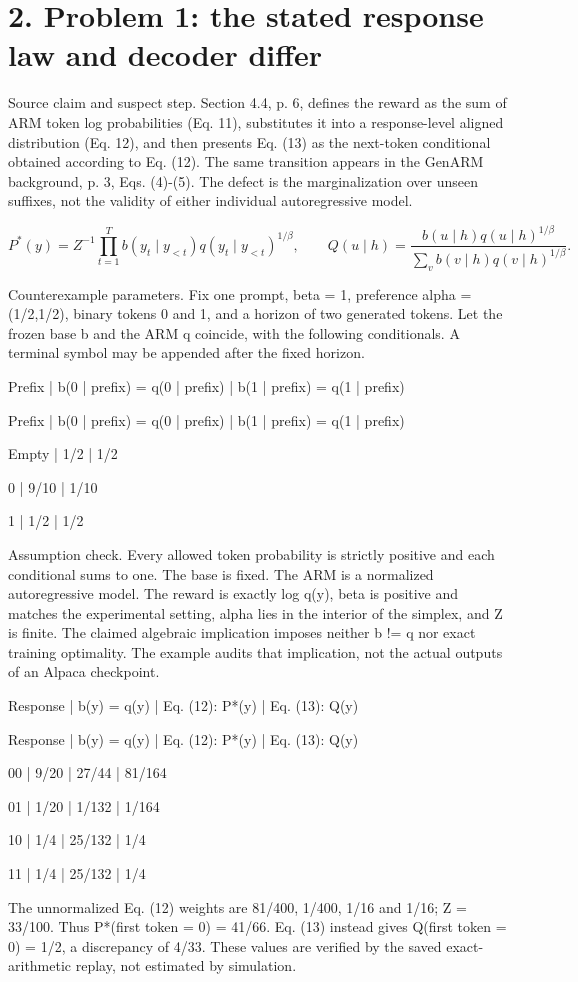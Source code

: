 \documentclass[10pt]{article}
\begin{document}
\section*{2. Problem 1: the stated response law and decoder differ}
Source claim and suspect step. Section 4.4, p. 6, defines the reward as the sum of ARM token log probabilities (Eq. 11), substitutes it into a response-level aligned distribution (Eq. 12), and then presents Eq. (13) as the next-token conditional obtained according to Eq. (12). The same transition appears in the GenARM background, p. 3, Eqs. (4)-(5). The defect is the marginalization over unseen suffixes, not the validity of either individual autoregressive model.\par
\[P^*(y)=Z^{-1}\prod_{t=1}^{T}b(y_t\mid y_{<t})q(y_t\mid y_{<t})^{1/\beta},\qquad Q(u\mid h)=\frac{b(u\mid h)q(u\mid h)^{1/\beta}}{\sum_v b(v\mid h)q(v\mid h)^{1/\beta}}.\]\par
Counterexample parameters. Fix one prompt, beta = 1, preference alpha = (1/2,1/2), binary tokens 0 and 1, and a horizon of two generated tokens. Let the frozen base b and the ARM q coincide, with the following conditionals. A terminal symbol may be appended after the fixed horizon.\par
Prefix | b(0 | prefix) = q(0 | prefix) | b(1 | prefix) = q(1 | prefix)\par
Prefix | b(0 | prefix) = q(0 | prefix) | b(1 | prefix) = q(1 | prefix)\par
Empty | 1/2 | 1/2\par
0 | 9/10 | 1/10\par
1 | 1/2 | 1/2\par
Assumption check. Every allowed token probability is strictly positive and each conditional sums to one. The base is fixed. The ARM is a normalized autoregressive model. The reward is exactly log q(y), beta is positive and matches the experimental setting, alpha lies in the interior of the simplex, and Z is finite. The claimed algebraic implication imposes neither b != q nor exact training optimality. The example audits that implication, not the actual outputs of an Alpaca checkpoint.\par
Response | b(y) = q(y) | Eq. (12): P*(y) | Eq. (13): Q(y)\par
Response | b(y) = q(y) | Eq. (12): P*(y) | Eq. (13): Q(y)\par
00 | 9/20 | 27/44 | 81/164\par
01 | 1/20 | 1/132 | 1/164\par
10 | 1/4 | 25/132 | 1/4\par
11 | 1/4 | 25/132 | 1/4\par
The unnormalized Eq. (12) weights are 81/400, 1/400, 1/16 and 1/16; Z = 33/100. Thus P*(first token = 0) = 41/66. Eq. (13) instead gives Q(first token = 0) = 1/2, a discrepancy of 4/33. These values are verified by the saved exact-arithmetic replay, not estimated by simulation.\par
\end{document}
